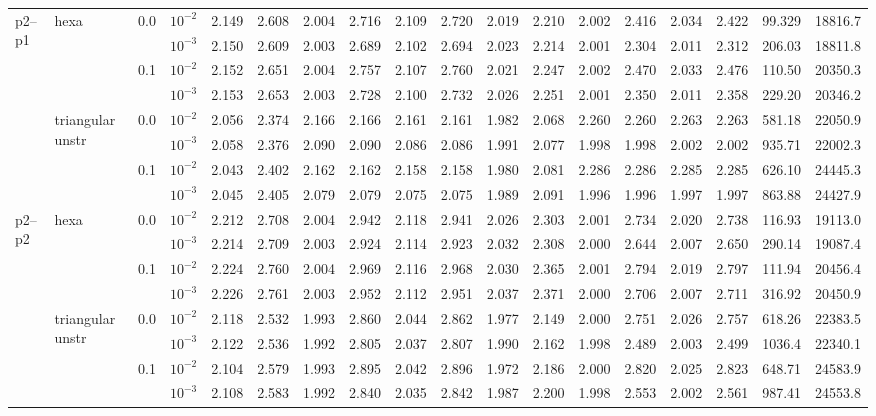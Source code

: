 \begin{longtable}{llclrrrrrrrrrrrrrr}
\multirow{8}{*}{p2--p1} & \multirow{4}{*}{hexa} & \multirow{2}{*}{0.0} & $10^{-2}$ & 2.149 & 2.608 & 2.004 & 2.716 & 2.109 & 2.720 & 2.019 & 2.210 & 2.002 & 2.416 & 2.034 & 2.422 & 99.329 & 18816.7 \\
& & & $10^{-3}$ & 2.150 & 2.609 & 2.003 & 2.689 & 2.102 & 2.694 & 2.023 & 2.214 & 2.001 & 2.304 & 2.011 & 2.312 & 206.03 & 18811.8 \\\cline{3-18}
& & \multirow{2}{*}{0.1} & $10^{-2}$ & 2.152 & 2.651 & 2.004 & 2.757 & 2.107 & 2.760 & 2.021 & 2.247 & 2.002 & 2.470 & 2.033 & 2.476 & 110.50 & 20350.3 \\
& & & $10^{-3}$ & 2.153 & 2.653 & 2.003 & 2.728 & 2.100 & 2.732 & 2.026 & 2.251 & 2.001 & 2.350 & 2.011 & 2.358 & 229.20 & 20346.2 \\\cline{2-18}
& \multirow{4}{*}{triangular unstr} & \multirow{2}{*}{0.0} & $10^{-2}$ & 2.056 & 2.374 & 2.166 & 2.166 & 2.161 & 2.161 & 1.982 & 2.068 & 2.260 & 2.260 & 2.263 & 2.263 & 581.18 & 22050.9 \\
& & & $10^{-3}$ & 2.058 & 2.376 & 2.090 & 2.090 & 2.086 & 2.086 & 1.991 & 2.077 & 1.998 & 1.998 & 2.002 & 2.002 & 935.71 & 22002.3 \\\cline{3-18}
& & \multirow{2}{*}{0.1} & $10^{-2}$ & 2.043 & 2.402 & 2.162 & 2.162 & 2.158 & 2.158 & 1.980 & 2.081 & 2.286 & 2.286 & 2.285 & 2.285 & 626.10 & 24445.3 \\
& & & $10^{-3}$ & 2.045 & 2.405 & 2.079 & 2.079 & 2.075 & 2.075 & 1.989 & 2.091 & 1.996 & 1.996 & 1.997 & 1.997 & 863.88 & 24427.9 \\\hline

\multirow{8}{*}{p2--p2} & \multirow{4}{*}{hexa} & \multirow{2}{*}{0.0} & $10^{-2}$ & 2.212 & 2.708 & 2.004 & 2.942 & 2.118 & 2.941 & 2.026 & 2.303 & 2.001 & 2.734 & 2.020 & 2.738 & 116.93 & 19113.0 \\
& & & $10^{-3}$ & 2.214 & 2.709 & 2.003 & 2.924 & 2.114 & 2.923 & 2.032 & 2.308 & 2.000 & 2.644 & 2.007 & 2.650 & 290.14 & 19087.4 \\\cline{3-18}
& & \multirow{2}{*}{0.1} & $10^{-2}$ & 2.224 & 2.760 & 2.004 & 2.969 & 2.116 & 2.968 & 2.030 & 2.365 & 2.001 & 2.794 & 2.019 & 2.797 & 111.94 & 20456.4 \\
& & & $10^{-3}$ & 2.226 & 2.761 & 2.003 & 2.952 & 2.112 & 2.951 & 2.037 & 2.371 & 2.000 & 2.706 & 2.007 & 2.711 & 316.92 & 20450.9 \\\cline{2-18}
& \multirow{4}{*}{triangular unstr} & \multirow{2}{*}{0.0} & $10^{-2}$ & 2.118 & 2.532 & 1.993 & 2.860 & 2.044 & 2.862 & 1.977 & 2.149 & 2.000 & 2.751 & 2.026 & 2.757 & 618.26 & 22383.5 \\
& & & $10^{-3}$ & 2.122 & 2.536 & 1.992 & 2.805 & 2.037 & 2.807 & 1.990 & 2.162 & 1.998 & 2.489 & 2.003 & 2.499 & 1036.4 & 22340.1 \\\cline{3-18}
& & \multirow{2}{*}{0.1} & $10^{-2}$ & 2.104 & 2.579 & 1.993 & 2.895 & 2.042 & 2.896 & 1.972 & 2.186 & 2.000 & 2.820 & 2.025 & 2.823 & 648.71 & 24583.9 \\
& & & $10^{-3}$ & 2.108 & 2.583 & 1.992 & 2.840 & 2.035 & 2.842 & 1.987 & 2.200 & 1.998 & 2.553 & 2.002 & 2.561 & 987.41 & 24553.8 \\\hline


\end{longtable}
